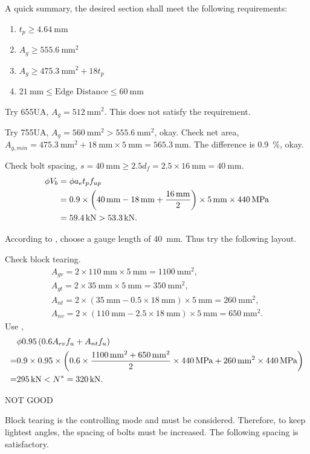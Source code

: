 \begin{solution}
A quick summary, the desired section shall meet the following requirements:
\begin{enumerate}
\item $t_p\geqslant\SI{4.64}{\mm}$
\item $A_g\geqslant\SI{555.6}{\mm^2}$
\item $A_g\geqslant\SI{475.3}{\mm^2}+18t_p$
\item $\SI{21}{\mm}\leqslant\text{Edge Distance}\leqslant\SI{60}{\mm}$
\end{enumerate}

Try 65\texttimes5UA, $A_g=\SI{512}{\mm^2}$. This does not satisfy the requirement.

Try 75\texttimes5UA, $A_g=\SI{560}{\mm^2}>\SI{555.6}{\mm^2}$, okay. Check net area,
$A_{g,min}=\SI{475.3}{\mm^2}+\SI{18}{\mm}\times\SI{5}{\mm}=\SI{565.3}{\mm}$. The difference is \SI{0.9}{\percent}, okay.

Check bolt spacing, $s=\SI{40}{\mm}\geqslant2.5d_f=2.5\times\SI{16}{\mm}=\SI{40}{\mm}$.
\begin{align*}
\phi{}V_b&=\phi{}a_et_pf_{up}\\&=0.9\times\left(\SI{40}{\milli\meter}-\SI{18}{\milli\meter}+\dfrac{\SI{16}{\milli\meter}}{2}\right)\times\SI{5}{\milli\meter}\times\SI{440}{\mega\pascal}\\&=\SI{59.4}{\kilo\newton}>\SI{53.3}{\kilo\newton}.
\end{align*}

According to , choose a gauge length of \SI{40}{\mm}. Thus try the following layout.
\begin{figure}[H]

\end{figure}
Check block tearing.
\begin{gather*}
A_{gv}=2\times\SI{110}{\mm}\times\SI{5}{\mm}=\SI{1100}{\mm^2},\\
A_{gt}=2\times\SI{35}{\mm}\times\SI{5}{\mm}=\SI{350}{\mm^2},\\
A_{nt}=2\times\left(\SI{35}{\mm}-0.5\times\SI{18}{\mm}\right)\times\SI{5}{\mm}=\SI{260}{\mm^2},\\
A_{nv}=2\times\left(\SI{110}{\mm}-2.5\times\SI{18}{\mm}\right)\times\SI{5}{\mm}=\SI{650}{\mm^2}.
\end{gather*}
Use ,
\begin{align*}
&\phi0.95\left(0.6A_{ev}f_u+A_{nt}f_u\right)\\
=&0.9\times0.95\times\left(0.6\times\dfrac{\SI{1100}{\milli\meter^2}+\SI{650}{\milli\meter^2}}{2}\times\SI{440}{\mega\pascal}+\SI{260}{\milli\meter^2}\times\SI{440}{\mega\pascal}\right)\\
=&\SI{295}{\kilo\newton}<N^*=\SI{320}{\kilo\newton}.
\end{align*}
\begin{flushright}
NOT GOOD
\end{flushright}
Block tearing is the controlling mode and must be considered. Therefore, to keep lightest angles, the spacing of bolts must be increased. The following spacing is satisfactory.
\begin{figure}[H]

\end{figure}
\end{solution}
